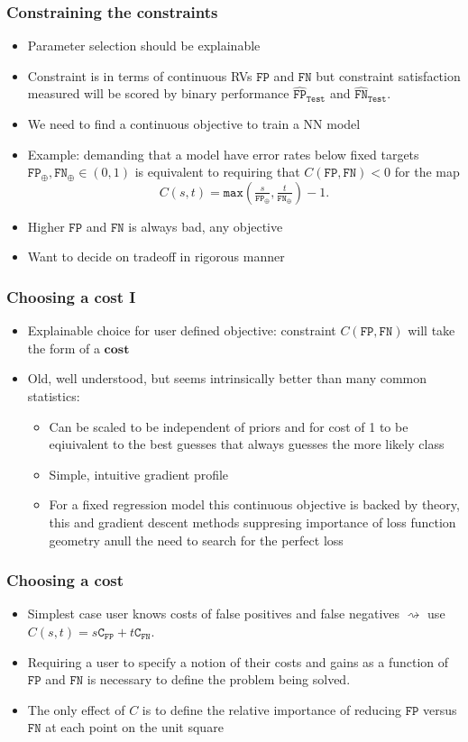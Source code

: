 \documentclass{beamer}
\newcommand{\TST}{{\texttt{Test}}}
\newcommand{\FP}{{\texttt{FP}}}
\newcommand{\FN}{{\texttt{FN}}}
\newcommand{\CFP}{{\texttt{C}_\FP}}
\newcommand{\CFN}{{\texttt{C}_\FN}}
\newcommand{\FPE}{{\widehat{\texttt{FP}}}}
\newcommand{\FNE}{{\widehat{\texttt{FN}}}}
\newcommand{\FPT}{{\texttt{FP}_\oplus}}
\newcommand{\FNT}{{\texttt{FN}_\oplus}}
\begin{document}
\begin{frame}
\frametitle{Constraining the constraints}
\begin{itemize}
\item
  Parameter selection should be explainable
\item
  Constraint is in terms of continuous RVs $\FP$ and $\FN$ but constraint satisfaction measured will be scored by binary performance $\FPE_\TST$ and $\FNE_\TST$.
\item
  We need to find a continuous objective to train a NN model
\item
  Example: demanding that a model have error rates below fixed targets $\FPT,\FNT\in(0,1)$ is equivalent to requiring that $C(\FP,\FN)<0$ for the map
  $$
    C(s,t)=\texttt{max}(\tfrac s{\FPT},\tfrac t{\FNT})-1.
  $$
\item
  Higher $\FP$ and $\FN$ is always bad, any objective
\item
  Want to decide on tradeoff in rigorous manner
\end{itemize}
\end{frame}
\begin{frame}
\frametitle{Choosing a cost I}
\begin{itemize}
\item
  Explainable choice for user defined objective: constraint $C(\FP,\FN)$ will take the form of a $\textbf{cost}$
\item
  Old, well understood, but seems intrinsically better than many common statistics\cite{ferrerno}:
\begin{itemize}
\item
  Can be scaled to be independent of priors and for cost of 1 to be eqiuivalent to the best guesses that always guesses the more likely class
\item
  Simple, intuitive gradient profile
\item
  For a fixed regression model this continuous objective is backed by theory, this and gradient descent methods suppresing importance of loss function geometry anull the need to search for the perfect loss
\end{itemize}
\end{itemize}
\end{frame}
\begin{frame}
\frametitle{Choosing a cost}
\begin{itemize}
\item
  Simplest case user knows costs of false positives and false negatives $\rightsquigarrow$ use $C(s,t)=s\CFP+t\CFN$.
\item
  Requiring a user to specify a notion of their costs and gains as a function of $\FP$ and $\FN$ is necessary to define the problem being solved.
\item
The only effect of $C$ is to define the relative importance of reducing $\FP$ versus $\FN$ at each point on the unit square
\end{itemize}
\end{frame}
\end{document}
